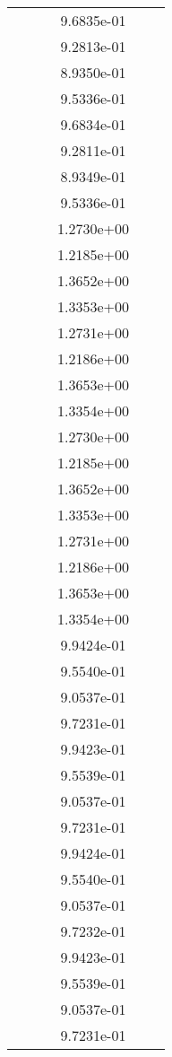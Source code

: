 \begin{xltabular}{\textwidth}{r|rS[table-format=1.3e+2]S[table-format=1.4e+2]S[table-format=1.4e+2]S[table-format=-1.5]}
&  &  & 9.6835e-01 & & \\
&  &  & 9.2813e-01 & & \\
&  &  & 8.9350e-01 & & \\
&  &  & 9.5336e-01 & & \\
&  &  & 9.6834e-01 & & \\
&  &  & 9.2811e-01 & & \\
&  &  & 8.9349e-01 & & \\
&  &  & 9.5336e-01 & & \\
&  &  & 1.2730e+00 & & \\
&  &  & 1.2185e+00 & & \\
&  &  & 1.3652e+00 & & \\
&  &  & 1.3353e+00 & & \\
&  &  & 1.2731e+00 & & \\
&  &  & 1.2186e+00 & & \\
&  &  & 1.3653e+00 & & \\
&  &  & 1.3354e+00 & & \\
&  &  & 1.2730e+00 & & \\
&  &  & 1.2185e+00 & & \\
&  &  & 1.3652e+00 & & \\
&  &  & 1.3353e+00 & & \\
&  &  & 1.2731e+00 & & \\
&  &  & 1.2186e+00 & & \\
&  &  & 1.3653e+00 & & \\
&  &  & 1.3354e+00 & & \\
&  &  & 9.9424e-01 & & \\
&  &  & 9.5540e-01 & & \\
&  &  & 9.0537e-01 & & \\
&  &  & 9.7231e-01 & & \\
&  &  & 9.9423e-01 & & \\
&  &  & 9.5539e-01 & & \\
&  &  & 9.0537e-01 & & \\
&  &  & 9.7231e-01 & & \\
&  &  & 9.9424e-01 & & \\
&  &  & 9.5540e-01 & & \\
&  &  & 9.0537e-01 & & \\
&  &  & 9.7232e-01 & & \\
&  &  & 9.9423e-01 & & \\
&  &  & 9.5539e-01 & & \\
&  &  & 9.0537e-01 & & \\
&  &  & 9.7231e-01 & & \\

\end{xltabular}

